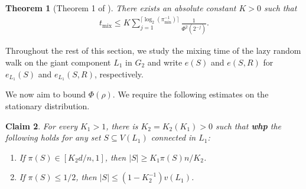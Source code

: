 \documentclass[reqno,final,a4paper]{amsart}
\newtheorem{thm}{Theorem}[section]
\newtheorem{claim}[thm]{Claim}
\theoremstyle{definition}
\newcommand{\tmix}{t_{\mathrm{mix}}}
\newcommand{\whp}{%
    \textbf{whp}
}
\newcommand{\1}{\mathbbm{1}}
\begin{document}
\begin{thm}[Theorem 1 of \cite{FR07a}] \label{th: mixing-time-tool}
\textit{There exists an absolute constant $K>0$ such that
\begin{align*}
    \tmix\le K\sum_{j=1}^{\lceil \log_2(\pi_{\min}^{-1})\rceil} \frac{1}{\Phi^2(2^{-j})}.
\end{align*}}
\end{thm}

Throughout the rest of this section, we study the mixing time of the lazy random walk on the giant component $L_1$ in $G_2$ and write $e(S)$ and $e(S,R)$ for $e_{L_1}(S)$ and $e_{L_1}(S,R)$, respectively. 

We now aim to bound $\Phi(\rho)$. We require the following estimates on the stationary distribution.
\begin{claim}\label{l: pi(S) and |S|} 
For every $K_1>1$, there is $K_2=K_2(K_1)>0$ such that \whp the following holds for any set $S\subseteq V(L_1)$ connected in $L_1$:
\begin{enumerate}[label=\upshape(\alph*)]
    \item If $\pi(S)\in [K_2d/n,1]$, then $|S|\ge K_1\pi(S)n/K_2$.
    \item If $\pi(S)\le 1/2$, then $|S|\le (1-K_2^{-1})v(L_1)$.
\end{enumerate}
\end{claim}
\end{document}
